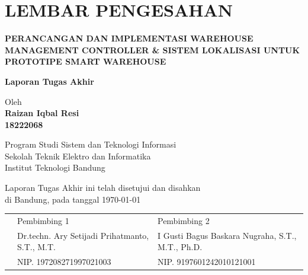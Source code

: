 \chapter*{LEMBAR PENGESAHAN}


\begin{center}
  {\large\bfseries PERANCANGAN DAN IMPLEMENTASI WAREHOUSE MANAGEMENT CONTROLLER \& SISTEM LOKALISASI UNTUK PROTOTIPE SMART WAREHOUSE}\\

  {\Large \textbf{Laporan Tugas Akhir}}\\




  {\large Oleh}\\[0.3cm]
    \textbf{
    {\large Raizan Iqbal Resi}\\
    {\large 18222068}
  }\\

  \vspace{0.5cm}

  {\large Program Studi Sistem dan Teknologi Informasi}\\
  {\large Sekolah Teknik Elektro dan Informatika}\\
  {\large Institut Teknologi Bandung}\\


  Laporan Tugas Akhir ini telah disetujui dan disahkan\\
  di Bandung, pada tanggal \today\\[1cm]

\begin{tabular}{p{1cm}p{7cm}p{7cm}}
  & Pembimbing 1 & Pembimbing 2 \\[2cm]
  & Dr.techn. Ary Setijadi Prihatmanto, S.T., M.T. & I Gusti Bagus Baskara Nugraha, S.T., M.T., Ph.D. \\[0.2cm]
  & NIP. 197208271997021003 & NIP. 9197601242010121001
\end{tabular}

\end{center}
\noindent


